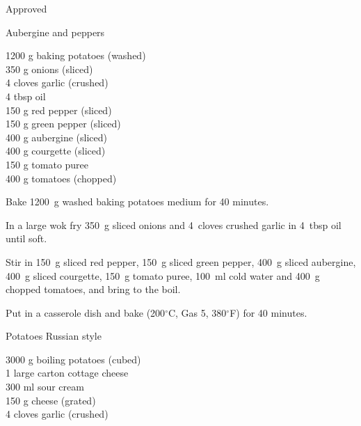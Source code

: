 \begin{menu}{Approved}
    \begin{recipe}{2}{Aubergine and peppers}%
    
		\begin{ingredients}
		1200 g baking potatoes (washed) \\
	350 g onions (sliced) \\
	4 cloves garlic (crushed) \\
	4 tbsp oil  \\
	150 g red pepper (sliced) \\
	150 g green pepper (sliced) \\
	400 g aubergine (sliced) \\
	400 g courgette (sliced) \\
	150 g tomato puree  \\
	400 g tomatoes (chopped) \\
	
		\end{ingredients}
	
    \begin{instructions}
    \item 
      Bake 1200~g washed baking potatoes
      medium for 40 minutes.
    \item 
        In a large wok fry
        350~g sliced onions
        and
        4~cloves crushed garlic
        in
        4~tbsp  oil
        until soft.
      \item 
        Stir in
        150~g sliced red pepper,
        150~g sliced green pepper,
        400~g sliced aubergine,
        400~g sliced courgette,
        150~g  tomato puree,
        100~ml  cold water
        and
        400~g chopped tomatoes,
        and bring to the boil.
      \item 
        Put in a casserole dish and bake 
      (200$^{\circ}$C, Gas 5, 380$^{\circ}$F)
     for 40 minutes.
      
    \end{instructions}
    \end{recipe}%
  
    \begin{recipe}{2}{Potatoes Russian style}%
    
		\begin{ingredients}
		3000 g boiling potatoes (cubed) \\
	1 large carton cottage cheese  \\
	300 ml sour cream  \\
	150 g cheese (grated) \\
	4 cloves garlic (crushed) \\
	

\end{ingredients}
\end{recipe}
\end{menu}
